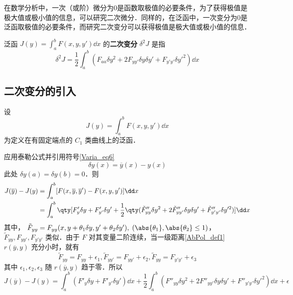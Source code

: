 
\begin{issues}
\issueTODO
\end{issues}

在数学分析中，一次（或阶）微分为0是函数取极值的必要条件，为了获得极值是极大值或极小值的信息，可以研究二次微分．同样的，在泛函中，一次变分为0是泛函取极值的必要条件，而研究二次变分可以获得极值是极大值或极小值的信息．

泛函 $J(y)=\int_a^bF(x,y,y')\dd x$ 的\textbf{二次变分} $\delta^2J$ 是指
\begin{equation}
\delta^2J=\frac{1}{2}\int_a^b(F_{aa}\delta y^2+2F_{yy'}\delta y\delta y'+F_{y'y'}\delta y'^2)\dd x
\end{equation}
\subsection{二次变分的引入}
设 
\begin{equation}
J(y)=\int_a^bF(x,y,y')\dd x
\end{equation}
为定义在有固定端点的 $C_1$ 类曲线上的泛函．

应用泰勒公式并引用符号\autoref{Varia_eq6}~
\begin{equation}
\delta y(x)=\overline{y}(x)-y(x)
\end{equation}
此处 $\delta y(a)=\delta y(b)=0$．则
\begin{equation}
\begin{aligned}
J(\overline{y})-J(y)&=\int_a^b[F(x,\overline{y},\overline{y}')-F(x,y,y')]\dd x\\
&=\int_a^b\qty[F'_y\delta y+F'_{y'}\delta y'+\frac{1}{2}\qty(\tilde{F}''_{yy}\delta y^2+2\tilde{F}''_{yy'}\delta y\delta y'+\tilde{F}''_{y'y'}\delta y'^2)]\dd x
\end{aligned}
\end{equation}
其中， $\tilde{F}_{yy}=F_{yy}(x,y+\theta_1\delta y,y'+\theta_2\delta y'),\;(\abs{\theta_1},\abs{\theta_2}\leq1)$，$\tilde{F}_{yy},F_{yy'},F_{y'y'}$ 类似．由于 $F$ 对其变量二阶连续，当一级距离\autoref{AbPol_def1}~ $r(\overline{y},y)$ 充分小时，就有
\begin{equation}
\tilde F_{yy}=F_{yy}+\epsilon_1,\tilde F_{yy'}=F_{yy'}+\epsilon_2,\tilde F_{yy}=F_{y'y'}+\epsilon_3
\end{equation}
其中 $\epsilon_1,\epsilon_2,\epsilon_3$ 随 $r(\overline{y},y)$ 趋于零．所以
\begin{equation}
J(\overline{y})-J(y)=\int_a^b(F'_y\delta y+F'_{y'}\delta y')\dd x+\frac{1}{2}\int_a^b(F''_{yy}\delta y^2+2F''_{yy'}\delta y\delta y'+F''_{y'y'}\delta y'^2)\dd x+\epsilon
\end{equation}